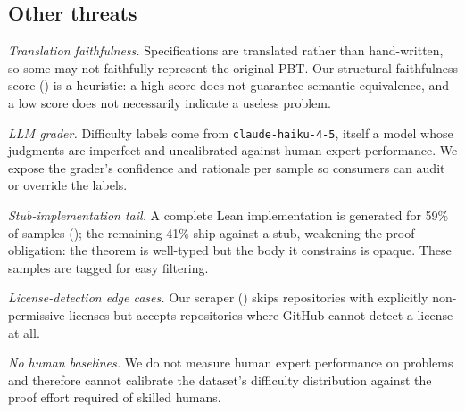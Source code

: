 \subsection{Other threats}
\label{sec:threats-other}

\emph{Translation faithfulness.} Specifications are translated rather than hand-written, so some may not faithfully represent the original PBT. Our structural-faithfulness score () is a heuristic: a high score does not guarantee semantic equivalence, and a low score does not necessarily indicate a useless problem.

\emph{LLM grader.} Difficulty labels come from \texttt{claude-haiku-4-5}, itself a model whose judgments are imperfect and uncalibrated against human expert performance. We expose the grader's confidence and rationale per sample so consumers can audit or override the labels.

\emph{Stub-implementation tail.} A complete Lean implementation is generated for 59\% of samples (); the remaining 41\% ship against a stub, weakening the proof obligation: the theorem is well-typed but the body it constrains is opaque. These samples are tagged for easy filtering.

\emph{License-detection edge cases.} Our scraper () skips repositories with explicitly non-permissive licenses but accepts repositories where GitHub cannot detect a license at all. 

\emph{No human baselines.} We do not measure human expert performance on \FVSpec problems and therefore cannot calibrate the dataset's difficulty distribution against the proof effort required of skilled humans.
